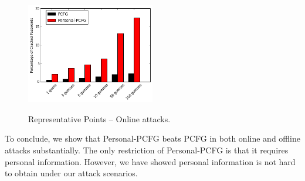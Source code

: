\begin{figure}[h!]
\centering
  \caption{Representative Points -- Online attacks.}{}
  \label{points}
  \centering
    \includegraphics[width=0.5\textwidth]{fig/online}
\end{figure}

To conclude, we show that Personal-PCFG beats PCFG in both online and offline attacks substantially. The only restriction of Personal-PCFG is that it requires personal information. However, we have showed personal information is not hard to obtain under our attack scenarios.


